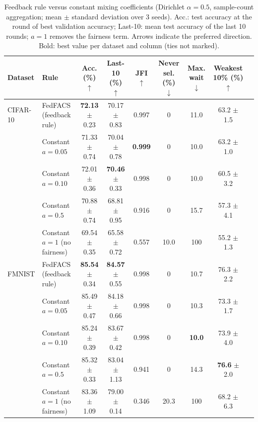 \documentclass[pdflatex,sn-mathphys-num,oneside]{sn-jnl}%
\theoremstyle{thmstyleone}%
\theoremstyle{thmstyletwo}%
\theoremstyle{thmstylethree}%
\newlength{\journalfloatwidth}
\begin{document}
\begin{table}[!htbp]
\centering
\footnotesize
\setlength{\tabcolsep}{2.5pt}
\renewcommand{\arraystretch}{1.08}
\caption{Feedback rule versus constant mixing coefficients (Dirichlet $\alpha=0.5$, sample-count aggregation; mean $\pm$ standard deviation over 3 seeds). Acc.: test accuracy at the round of best validation accuracy; Last-10: mean test accuracy of the last 10 rounds; $a=1$ removes the fairness term. Arrows indicate the preferred direction. Bold: best value per dataset and column (ties not marked).}
\label{tab:mixing}
\begin{tabular*}{\journalfloatwidth}{@{\extracolsep{\fill}}llccccccc@{}}
\toprule
Dataset & Rule & Acc. (\%) $\uparrow$ & Last-10 (\%) $\uparrow$ & JFI $\uparrow$ & Never sel. (\%) $\downarrow$ & Max. wait $\downarrow$ & Weakest 10\% (\%) $\uparrow$ \\
\midrule
CIFAR-10 & FedFACS (feedback rule) & \textbf{72.13} $\pm$ 0.23 & 70.17 $\pm$ 0.83 & 0.997 & 0 & 11.0 & 63.2 $\pm$ 1.5 \\
         & Constant $a=0.05$       & 71.33 $\pm$ 0.74 & 70.04 $\pm$ 0.78 & \textbf{0.999} & 0 & 10.0 & 63.2 $\pm$ 1.0 \\
         & Constant $a=0.10$       & 72.01 $\pm$ 0.36 & \textbf{70.46} $\pm$ 0.33 & 0.998 & 0 & 10.0 & 60.5 $\pm$ 3.2 \\
         & Constant $a=0.5$        & 70.88 $\pm$ 0.74 & 68.81 $\pm$ 0.95 & 0.916 & 0 & 15.7 & 57.3 $\pm$ 4.1 \\
         & Constant $a=1$ (no fairness) & 69.54 $\pm$ 0.35 & 65.58 $\pm$ 0.72 & 0.557 & 10.0 & 100 & 55.2 $\pm$ 1.3 \\
\midrule
FMNIST   & FedFACS (feedback rule) & \textbf{85.54} $\pm$ 0.34 & \textbf{84.57} $\pm$ 0.55 & 0.998 & 0 & 10.7 & 76.3 $\pm$ 2.2 \\
         & Constant $a=0.05$       & 85.49 $\pm$ 0.47 & 84.18 $\pm$ 0.66 & 0.998 & 0 & 10.3 & 73.3 $\pm$ 1.7 \\
         & Constant $a=0.10$       & 85.24 $\pm$ 0.39 & 83.67 $\pm$ 0.42 & 0.998 & 0 & \textbf{10.0} & 73.9 $\pm$ 4.0 \\
         & Constant $a=0.5$        & 85.32 $\pm$ 0.33 & 83.04 $\pm$ 1.13 & 0.941 & 0 & 14.3 & \textbf{76.6} $\pm$ 2.0 \\
         & Constant $a=1$ (no fairness) & 83.36 $\pm$ 1.09 & 79.00 $\pm$ 0.14 & 0.346 & 20.3 & 100 & 68.2 $\pm$ 6.3 \\
\bottomrule
\end{tabular*}
\end{table}
\end{document}
